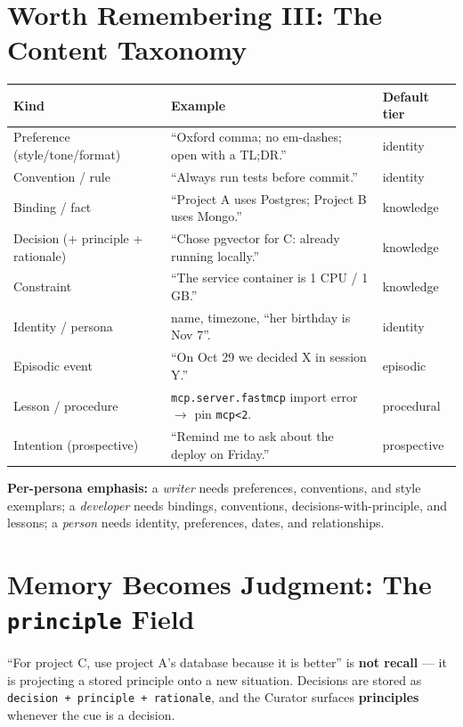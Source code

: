 \section{Worth Remembering III: The Content Taxonomy}
\begin{longtable}{@{}p{}p{}p{}@{}}
\toprule
Kind & Example & Default tier \\
\midrule
Preference (style/tone/format) & ``Oxford comma; no em-dashes; open with a TL;DR.'' & identity \\
Convention / rule & ``Always run tests before commit.'' & identity \\
Binding / fact & ``Project A uses Postgres; Project B uses Mongo.'' & knowledge \\
Decision (+ principle + rationale) & ``Chose pgvector for C: already running locally.'' & knowledge \\
Constraint & ``The service container is 1 CPU / 1 GB.'' & knowledge \\
Identity / persona & name, timezone, ``her birthday is Nov 7''. & identity \\
Episodic event & ``On Oct 29 we decided X in session Y.'' & episodic \\
Lesson / procedure & \texttt{mcp.server.fastmcp} import error $\rightarrow$ pin \texttt{mcp<2}. & procedural \\
Intention (prospective) & ``Remind me to ask about the deploy on Friday.'' & prospective \\
\bottomrule
\end{longtable}

\noindent\textbf{Per-persona emphasis:} a \emph{writer} needs preferences, conventions, and style
exemplars; a \emph{developer} needs bindings, conventions, decisions-with-principle, and lessons; a
\emph{person} needs identity, preferences, dates, and relationships.

\section{Memory Becomes Judgment: The \texttt{principle} Field}
``For project C, use project A's database because it is better'' is \textbf{not recall} --- it is
projecting a stored principle onto a new situation. Decisions are stored as
\texttt{decision + principle + rationale}, and the Curator surfaces \textbf{principles} whenever the
cue is a decision.

